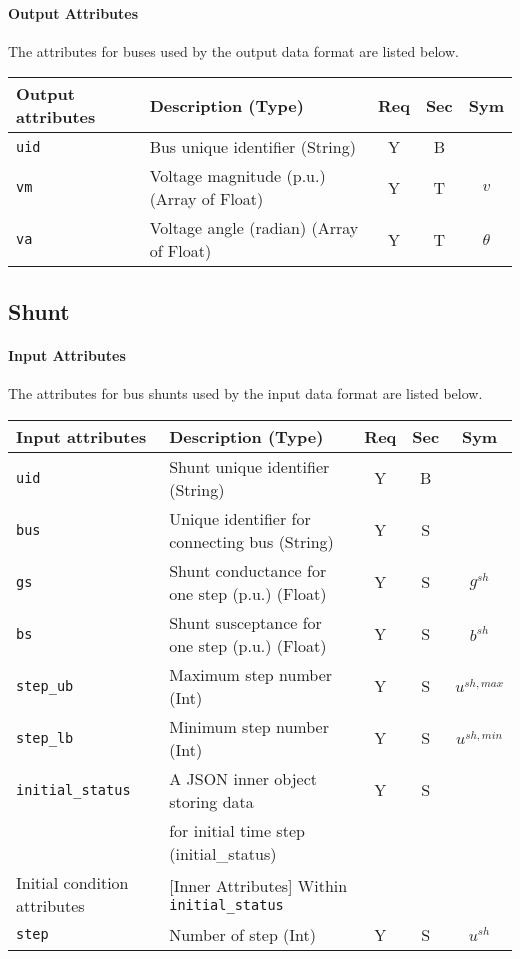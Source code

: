 \documentclass{article}
\begin{document}
\paragraph{Output Attributes} The attributes for buses used by the output data format are listed below.

\begin{center}
\small
\begin{tabular}{ l | l | c | c | c |}
Output attributes & Description (Type) & Req & Sec & Sym\\
\hline
  {\tt uid} & Bus unique identifier (String) & Y & B & \\
  
  {\tt vm} & Voltage magnitude (p.u.) (Array of Float)  & Y & T & $v$ \\
  {\tt va} & Voltage angle (radian) (Array of Float)  & Y & T & $\theta$\\
\hline
\end{tabular}
\end{center}



\subsection{Shunt}
\label{nom:shunt}
\paragraph{Input Attributes} The attributes for bus shunts used by the input data format are listed below.
\begin{center}
\small

\begin{tabular}{ l | l | c | c | c | }
Input attributes & Description (Type) & Req & Sec & Sym\\
\hline
  {\tt uid} & Shunt unique identifier (String) & Y & B &  \\
  {\tt bus} & Unique identifier for connecting bus (String) & Y & S &  \\
    {\tt gs}  & Shunt conductance for one step (p.u.) (Float) & Y & S & $g^{sh}$ \\
    {\tt bs}  & Shunt susceptance for one step (p.u.) (Float) & Y & S & $b^{sh}$ \\
  {\tt step\_ub}      & Maximum step number (Int)  & Y & S & $u^{sh,max}$\\
  {\tt step\_lb}      & Minimum step number (Int)  & Y & S & $u^{sh,min}$\\
  {\tt initial\_status} & A JSON inner object storing data  & Y & S &  \\
       & for initial time step (initial\_status) &  &  &  \\
  \hline
  Initial condition attributes & [Inner Attributes] Within {\tt initial\_status} & & & \\
  \hline
  {\tt step}       & Number of step (Int)  & Y  & S &$u^{sh}$\\  
\hline
\end{tabular}
\end{center}
\end{document}
